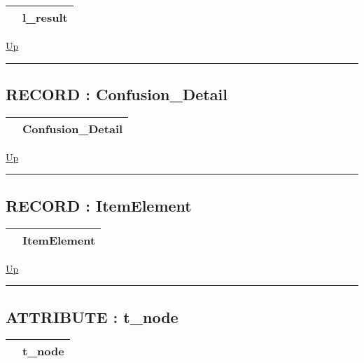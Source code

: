 {\renewcommand{\arraystretch}{1.5}
\begin{tabularx}{\textwidth}{|>{\raggedright\arraybackslash}l|X|}
\hline
\hspace{0pt} & l\_result \\
\hline
\end{tabularx}
}

\hyperlink{ecldoc:ML_Core.Types}{Up}

\par


\rule{\textwidth}{0.4pt}
\subsection*{RECORD : Confusion\_Detail}
\hypertarget{ecldoc:ml_core.types.confusion_detail}{}

{\renewcommand{\arraystretch}{1.5}
\begin{tabularx}{\textwidth}{|>{\raggedright\arraybackslash}l|X|}
\hline
\hspace{0pt} & Confusion\_Detail \\
\hline
\end{tabularx}
}

\hyperlink{ecldoc:ML_Core.Types}{Up}

\par


\rule{\textwidth}{0.4pt}
\subsection*{RECORD : ItemElement}
\hypertarget{ecldoc:ml_core.types.itemelement}{}

{\renewcommand{\arraystretch}{1.5}
\begin{tabularx}{\textwidth}{|>{\raggedright\arraybackslash}l|X|}
\hline
\hspace{0pt} & ItemElement \\
\hline
\end{tabularx}
}

\hyperlink{ecldoc:ML_Core.Types}{Up}

\par


\rule{\textwidth}{0.4pt}
\subsection*{ATTRIBUTE : t\_node}
\hypertarget{ecldoc:ml_core.types.t_node}{}

{\renewcommand{\arraystretch}{1.5}
\begin{tabularx}{\textwidth}{|>{\raggedright\arraybackslash}l|X|}
\hline
\hspace{0pt} & t\_node \\
\hline
\end{tabularx}
}

